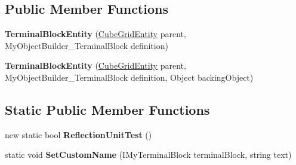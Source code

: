 \subsection*{Public Member Functions}
\begin{DoxyCompactItemize}
\item 
\hypertarget{class_s_e_mod_a_p_i_internal_1_1_a_p_i_1_1_entity_1_1_sector_1_1_sector_object_1_1_cube_grid_1_120546f0333a2c3c0991eba1a19f6100c_a8efc22798b7270b60bdb9187ea23c8d4}{}{\bfseries Terminal\+Block\+Entity} (\hyperlink{class_s_e_mod_a_p_i_internal_1_1_a_p_i_1_1_entity_1_1_sector_1_1_sector_object_1_1_cube_grid_entity}{Cube\+Grid\+Entity} parent, My\+Object\+Builder\+\_\+\+Terminal\+Block definition)\label{class_s_e_mod_a_p_i_internal_1_1_a_p_i_1_1_entity_1_1_sector_1_1_sector_object_1_1_cube_grid_1_120546f0333a2c3c0991eba1a19f6100c_a8efc22798b7270b60bdb9187ea23c8d4}

\item 
\hypertarget{class_s_e_mod_a_p_i_internal_1_1_a_p_i_1_1_entity_1_1_sector_1_1_sector_object_1_1_cube_grid_1_120546f0333a2c3c0991eba1a19f6100c_abd2ef96002f3a2873878831f1fb07a4e}{}{\bfseries Terminal\+Block\+Entity} (\hyperlink{class_s_e_mod_a_p_i_internal_1_1_a_p_i_1_1_entity_1_1_sector_1_1_sector_object_1_1_cube_grid_entity}{Cube\+Grid\+Entity} parent, My\+Object\+Builder\+\_\+\+Terminal\+Block definition, Object backing\+Object)\label{class_s_e_mod_a_p_i_internal_1_1_a_p_i_1_1_entity_1_1_sector_1_1_sector_object_1_1_cube_grid_1_120546f0333a2c3c0991eba1a19f6100c_abd2ef96002f3a2873878831f1fb07a4e}

\end{DoxyCompactItemize}
\subsection*{Static Public Member Functions}
\begin{DoxyCompactItemize}
\item 
\hypertarget{class_s_e_mod_a_p_i_internal_1_1_a_p_i_1_1_entity_1_1_sector_1_1_sector_object_1_1_cube_grid_1_120546f0333a2c3c0991eba1a19f6100c_a60935cf99d0a80b29a0761fda2c6c725}{}new static bool {\bfseries Reflection\+Unit\+Test} ()\label{class_s_e_mod_a_p_i_internal_1_1_a_p_i_1_1_entity_1_1_sector_1_1_sector_object_1_1_cube_grid_1_120546f0333a2c3c0991eba1a19f6100c_a60935cf99d0a80b29a0761fda2c6c725}

\item 
\hypertarget{class_s_e_mod_a_p_i_internal_1_1_a_p_i_1_1_entity_1_1_sector_1_1_sector_object_1_1_cube_grid_1_120546f0333a2c3c0991eba1a19f6100c_accb3ca58239954b9b266eba061ae376d}{}static void {\bfseries Set\+Custom\+Name} (I\+My\+Terminal\+Block terminal\+Block, string text)\label{class_s_e_mod_a_p_i_internal_1_1_a_p_i_1_1_entity_1_1_sector_1_1_sector_object_1_1_cube_grid_1_120546f0333a2c3c0991eba1a19f6100c_accb3ca58239954b9b266eba061ae376d}

\end{DoxyCompactItemize}

